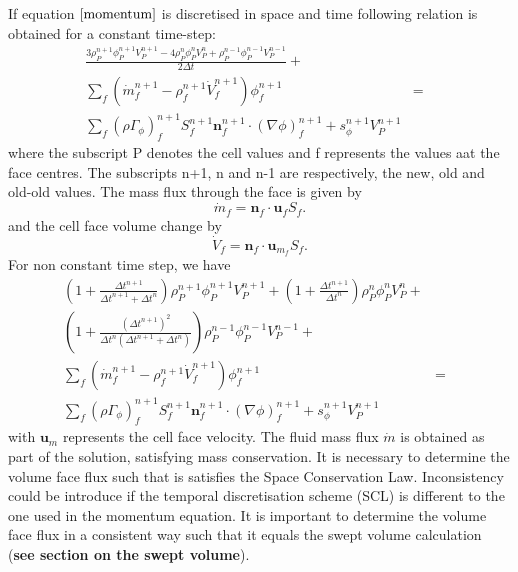 \documentclass[10pt,a4paper,twoside]{article}
\begin{document}
If equation $\ref{momentum}$ is discretised in space and time following relation is obtained for a constant time-step:
\begin{eqnarray}
\frac{3\rho_P^{n+1}\phi_P^{n+1}V_P^{n+1} - 4\rho_P^{n}\phi_P^{n}V_P^{n} + \rho_P^{n-1}\phi_P^{n-1}V_P^{n-1}}{2\Delta t} + \\
\displaystyle\sum_{f}(\dot{m}_f^{n+1}  - \rho_f^{n+1}\dot{V}_f^{n+1})\phi_f^{n+1}  & = &\\
 \displaystyle\sum_{f} (\rho\Gamma_{\phi})_f^{n+1}S_f^{n+1}\textbf{n}_f^{n+1} \cdot(\nabla \phi)_f^{n+1} + s_{\phi}^{n+1}V_P^{n+1}
\end{eqnarray}
where the subscript P denotes the cell values and f represents the values aat the face centres. The subscripts n+1, n and n-1 are respectively, the new, old and old-old values. The mass flux through the face is given by 
\begin{equation}\label{mf}
\dot{m}_f = \boldsymbol{n}_f\cdot \boldsymbol{u}_fS_f.
\end{equation}
and the cell face volume change by 
\begin{equation}
\dot{V}_f = \boldsymbol{n}_f\cdot \boldsymbol{u}_{{m}_f}S_f.
\end{equation}
For non constant time step, we have
\begin{eqnarray*}
\left(1 + \frac{\Delta t^{n+1}}{\Delta t^{n+1}+ \Delta t^{n}}\right)\rho_P^{n+1}\phi_P^{n+1}V_P^{n+1} + \left(1 + \frac{\Delta t^{n+1}}{\Delta t^{n}}\right)\rho_P^{n}\phi_P^{n}V_P^{n} + \\ 
\left(1 + \frac{(\Delta t^{n+1})^2}{\Delta t^n(\Delta t^{n+1}+ \Delta t^{n})}\right) \rho_P^{n-1}\phi_P^{n-1}V_P^{n-1} + \\ 
\displaystyle\sum_{f}(\dot{m}_f^{n+1}  - \rho_f^{n+1}\dot{V}_f^{n+1})\phi_f^{n+1}  & = &\\
\displaystyle\sum_{f} (\rho\Gamma_{\phi})_f^{n+1}S_f^{n+1}\textbf{n}_f^{n+1} \cdot(\nabla \phi)_f^{n+1} + s_{\phi}^{n+1}V_P^{n+1}
\end{eqnarray*}
with $\boldsymbol{u}_m$ represents the cell face velocity. The fluid mass flux $\dot{m}$ is obtained as part of the solution, satisfying mass conservation. It is necessary to determine the volume face flux such that is satisfies the Space Conservation Law. Inconsistency could be introduce if the temporal discretisation scheme (SCL) is different to the one used in the momentum equation. It is important to determine the volume face flux in a consistent way such that it equals the swept volume calculation (\textbf{see section on the swept volume}).
\end{document}
